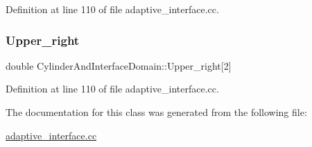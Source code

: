Definition at line 110 of file adaptive\+\_\+interface.\+cc.

\mbox{\label{classCylinderAndInterfaceDomain_a87b1a618cc0116816b5460f00f3875a6}} 
\subsubsection{\texorpdfstring{Upper\+\_\+right}{Upper\_right}}
{\footnotesize\ttfamily double Cylinder\+And\+Interface\+Domain\+::\+Upper\+\_\+right\mbox{[}2\mbox{]}\hspace{0.3cm}{\ttfamily [private]}}



Definition at line 110 of file adaptive\+\_\+interface.\+cc.



The documentation for this class was generated from the following file\+:\begin{DoxyCompactItemize}
\item 
\hyperlink{adaptive__interface_8cc}{adaptive\+\_\+interface.\+cc}\end{DoxyCompactItemize}
